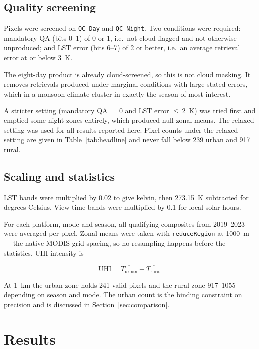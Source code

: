\documentclass[11pt,a4paper]{article}
\begin{document}
\subsection{Quality screening}
\label{sec:qc}

Pixels were screened on \texttt{QC\_Day} and \texttt{QC\_Night}. Two
conditions were required: mandatory QA (bits 0--1) of 0 or 1, i.e.\
not cloud-flagged and not otherwise unproduced; and LST error (bits
6--7) of 2 or better, i.e.\ an average retrieval error at or below
\SI{3}{\kelvin}.

The eight-day product is already cloud-screened, so this is not cloud
masking. It removes retrievals produced under marginal conditions with
large stated errors, which in a monsoon climate cluster in exactly the
season of most interest.

A stricter setting (mandatory QA $=0$ and LST error
$\leq\,$\SI{2}{\kelvin}) was tried first and emptied some night zones
entirely, which produced null zonal means. The relaxed setting was
used for all results reported here. Pixel counts under the relaxed
setting are given in Table~\ref{tab:headline} and never fall below 239
urban and 917 rural.

\subsection{Scaling and statistics}

LST bands were multiplied by \num{0.02} to give kelvin, then
\SI{273.15}{\kelvin} subtracted for degrees Celsius. View-time bands
were multiplied by \num{0.1} for local solar hours.

For each platform, mode and season, all qualifying composites from
2019--2023 were averaged per pixel. Zonal means were taken with
\texttt{reduceRegion} at \SI{1000}{\metre} --- the native MODIS grid
spacing, so no resampling happens before the statistics. UHI intensity
is

\begin{equation}
  \mathrm{UHI} = \overline{T_{\mathrm{urban}}} - \overline{T_{\mathrm{rural}}}
\end{equation}

At \SI{1}{\kilo\metre} the urban zone holds 241 valid pixels and the
rural zone 917--1055 depending on season and mode. The urban count is
the binding constraint on precision and is discussed in
Section~\ref{sec:comparison}.

\section{Results}
\end{document}

